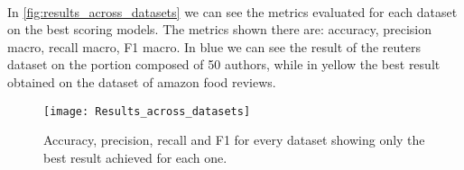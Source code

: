\paragraph{}
In \autoref{fig:results_across_datasets} we can see the metrics evaluated for each dataset on the best scoring models. The metrics shown there are: accuracy, precision macro, recall macro, F1 macro.
In blue we can see the result of the reuters dataset on the portion composed of 50 authors, while in yellow the best result obtained on the dataset of amazon food reviews.
\begin{figure}[ht]
	\centering
	\texttt{[image: Results\_across\_datasets]}
	\caption[Best performance across all datasets]{Accuracy, precision, recall and F1 for every dataset showing only the best result achieved for each one.}
	\label{fig:results_across_datasets}
\end{figure}
